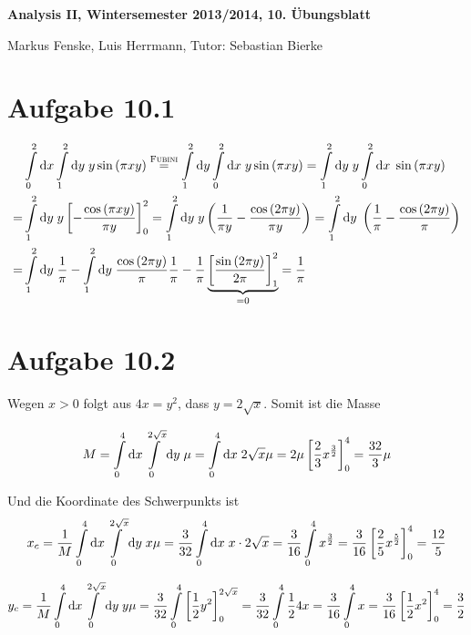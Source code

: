 \documentclass[a4paper,german,12pt,smallheadings]{scrartcl}
\begin{document}
\begin{center}
\bfseries %
\sffamily %
\vspace{-40pt}
Analysis II, Wintersemester 2013/2014, 10. Übungsblatt

Markus Fenske, Luis Herrmann, Tutor: Sebastian Bierke
\vspace{-10pt}
\end{center}
\allowdisplaybreaks %
\section*{Aufgabe 10.1}
\begin{align*}
  & \int\limits_0^2 \dif x \int\limits_1^2 \dif y \; y \sin\del{\pi x y} \overset{\text{\textsc{Fubini}}}{=}
    \int\limits_1^2 \dif y \int\limits_0^2 \dif x \; y \sin\del{\pi x y} =
    \int\limits_1^2 \dif y \; y \int\limits_0^2 \dif x \; \sin\del{\pi x y} \\ =
  & \int\limits_1^2 \dif y \; y \sbr{- \frac{\cos\del{\pi x y}}{\pi y}}_0^2 =
    \int\limits_1^2 \dif y \; y \del{\frac{1}{\pi y} - \frac{\cos\del{2 \pi y}}{\pi y}} =
    \int\limits_1^2 \dif y \; \del{\frac{1}{\pi} - \frac{\cos\del{2 \pi y}}{\pi}} \\ =
  & \int\limits_1^2 \dif y \; \frac{1}{\pi} - \int\limits_1^2 \dif y \; \frac{\cos\del{2 \pi y}}{\pi}
    \frac{1}{\pi} - \frac{1}{\pi} \underbrace{\sbr{\frac{\sin\del{2 \pi y}}{2 \pi}}_1^2}_{=0} = \frac{1}{\pi}
\end{align*}

\section*{Aufgabe 10.2}
Wegen $x > 0$ folgt aus $4x = y^2$, dass $y = 2 \sqrt{x}$. Somit ist die Masse

\begin{align*}
  M
  = \int\limits_0^4 \dif x \int\limits_0^{2 \sqrt{x}} \dif y \; \mu
  = \int\limits_0^4 \dif x \; 2 \sqrt{x} \mu
  = 2 \mu \sbr{\frac{2}{3} x^\frac{3}{2}}_0^4
  = \frac{32}{3} \mu
\end{align*}

Und die Koordinate des Schwerpunkts ist
\begin{align*}
  x_c
  = \frac{1}{M} \int\limits_0^4 \dif x \int\limits_0^{2\sqrt{x}} \dif y \; x \mu
  = \frac{3}{32} \int\limits_0^4 \dif x \; x \cdot 2 \sqrt{x}
  = \frac{3}{16} \int\limits_0^4 x^\frac{3}{2}
  = \frac{3}{16} \sbr{\frac{2}{5} x^\frac{5}{2}}_0^4
  = \frac{12}{5}
\end{align*}

\begin{align*}
  y_c
  = \frac{1}{M} \int\limits_0^4 \dif x \int\limits_0^{2 \sqrt{x}} \dif y \; y \mu
  = \frac{3}{32} \int\limits_0^4 \sbr{\frac{1}{2} y^2}_0^{2\sqrt{x}}
  = \frac{3}{32} \int\limits_0^4 \frac{1}{2} 4 x
  = \frac{3}{16} \int\limits_0^4 x
  = \frac{3}{16} \sbr{\frac{1}{2} x^2}_0^4
  = \frac{3}{2}
\end{align*}
\end{document}

